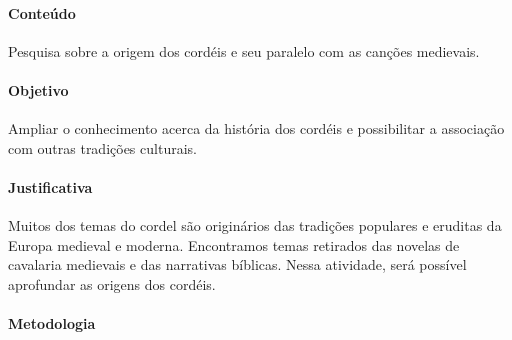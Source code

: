 \documentclass[12pt]{extarticle}
\begin{document}
\paragraph{Conteúdo} Pesquisa sobre a origem dos cordéis e seu paralelo com as
canções medievais.

\paragraph{Objetivo} Ampliar o conhecimento acerca da história dos cordéis
e possibilitar a associação com outras tradições culturais.

\paragraph{Justificativa} Muitos dos temas do cordel são originários das
tradições populares e eruditas da Europa medieval e moderna. Encontramos temas
retirados das novelas de cavalaria medievais e das narrativas bíblicas. Nessa
atividade, será possível aprofundar as origens dos cordéis.

\paragraph{Metodologia}
\end{document}
